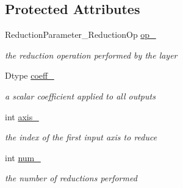 \subsection*{Protected Attributes}
\begin{DoxyCompactItemize}
\item 
\mbox{\label{classcaffe_1_1_reduction_layer_aa65f46eaf24eca2948592bcb9e127346}} 
Reduction\+Parameter\+\_\+\+Reduction\+Op \mbox{\hyperlink{classcaffe_1_1_reduction_layer_aa65f46eaf24eca2948592bcb9e127346}{op\+\_\+}}
\begin{DoxyCompactList}\small\item\em the reduction operation performed by the layer \end{DoxyCompactList}\item 
\mbox{\label{classcaffe_1_1_reduction_layer_a7aeb19ec25f01d4df995ba2122fbfeb3}} 
Dtype \mbox{\hyperlink{classcaffe_1_1_reduction_layer_a7aeb19ec25f01d4df995ba2122fbfeb3}{coeff\+\_\+}}
\begin{DoxyCompactList}\small\item\em a scalar coefficient applied to all outputs \end{DoxyCompactList}\item 
\mbox{\label{classcaffe_1_1_reduction_layer_ac42612a3e9d6fadcb2a57041595033bf}} 
int \mbox{\hyperlink{classcaffe_1_1_reduction_layer_ac42612a3e9d6fadcb2a57041595033bf}{axis\+\_\+}}
\begin{DoxyCompactList}\small\item\em the index of the first input axis to reduce \end{DoxyCompactList}\item 
\mbox{\label{classcaffe_1_1_reduction_layer_a7c336b1554118959a13cecfd9701998e}} 
int \mbox{\hyperlink{classcaffe_1_1_reduction_layer_a7c336b1554118959a13cecfd9701998e}{num\+\_\+}}
\begin{DoxyCompactList}\small\item\em the number of reductions performed \end{DoxyCompactList}\item 
\mbox{\label{classcaffe_1_1_reduction_layer_a5d0cdd8ca00e6bbd425a51bef2214a7e}} 

\end{DoxyCompactItemize}
